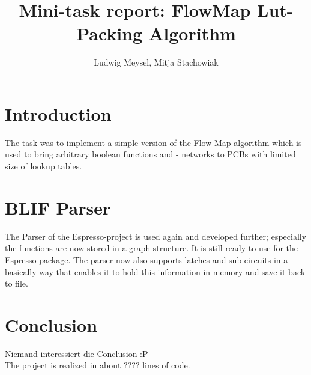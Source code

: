 \documentclass[colorback,accentcolor=tud1c,11pt]{tudreport}
\title{Mini-task report: FlowMap Lut-Packing Algorithm}
\subtitle{Ludwig Meysel, Mitja Stachowiak}
\begin{document}
\maketitle



\chapter{Introduction}
The task was to implement a simple version of the Flow Map algorithm which is used to bring arbitrary boolean functions and - networks to PCBs with limited size of lookup tables.


\chapter{BLIF Parser}
The Parser of the Espresso-project is used again and developed further; especially the functions are now stored in a graph-structure. It is still ready-to-use for the Espresso-package. The parser now also supports latches and sub-circuits in a basically way that enables it to hold this information in memory and save it back to file.



\chapter{Conclusion}
Niemand interessiert die Conclusion   :P
\\
The project is realized in about ???? lines of code.





\end{document}
